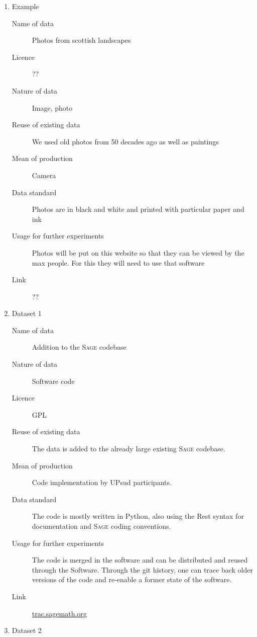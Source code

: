 \documentclass[12pt]{amsbook}
\newcommand{\software}[1]{\textsc{#1}\xspace}
\newcommand{\Sage}{\software{Sage}}
\begin{document}
\begin{enumerate}


\item{Example}


\begin{description}
\item[Name of data] Photos from scottish landscapes
\item[Licence]  ??
\item[Nature of data] Image, photo
\item[Reuse of existing data] We used old photos from 50 decades ago as well as paintings
\item[Mean of production] Camera
\item[Data standard] Photos are in black and white and printed with particular paper and ink
\item [Usage for further experiments] Photos will be put on this website so that they can be viewed by the max people. For this they will need to use that software
\item [Link] ??
\end{description}


\item {Dataset 1}


\begin{description}
\item[Name of data] Addition to the \Sage codebase
\item[Nature of data] Software code
\item[Licence] GPL
\item[Reuse of existing data] The data is added to the already large existing \Sage codebase.
\item[Mean of production] Code implementation by UPsud participants.
\item[Data standard] The code is mostly written in Python, also using the Rest syntax for documentation and \Sage coding conventions.
\item [Usage for further experiments] The code is merged in the software and can be distributed and reused through the Software. Through the git history,
one can trace back older versions of the code and re-enable a former state of the software.
\item [Link] \href{http://trac.sagemath.org/}{trac.sagemath.org}
\end{description}


\item{Dataset 2}



\end{enumerate}
\end{document}
